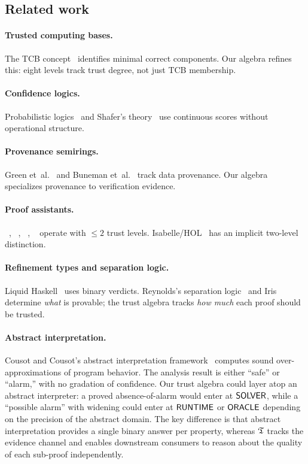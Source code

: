 \documentclass[11pt]{article}
\begin{document}
\subsection{Related work}

\paragraph{Trusted computing bases.}
The TCB concept~\cite{sel4,certikos} identifies minimal correct
components.  Our algebra refines this: eight levels track trust
degree, not just TCB membership.

\paragraph{Confidence logics.}
Probabilistic logics~\cite{halpern03} and Shafer's
theory~\cite{shafer76} use continuous scores without
operational structure.

\paragraph{Provenance semirings.}
Green et~al.~\cite{green07} and Buneman et~al.~\cite{buneman01}
track data provenance.  Our algebra specializes provenance
to verification evidence.

\paragraph{Proof assistants.}
\LEAN{}~\cite{lean4}, \Coq{}~\cite{coq}, \Fstar{}~\cite{fstar},
\Dafny{}~\cite{dafny} operate with $\leq 2$ trust levels.
Isabelle/HOL~\cite{isabelle} has an implicit two-level distinction.

\paragraph{Refinement types and separation logic.}
Liquid Haskell~\cite{liquidhaskell} uses binary verdicts.
Reynolds's separation logic~\cite{reynolds02} and Iris~\cite{iris}
determine \emph{what} is provable; the trust algebra tracks
\emph{how much} each proof should be trusted.

\paragraph{Abstract interpretation.}
Cousot and Cousot's abstract interpretation
framework~\cite{cousot77} computes sound over-approximations
of program behavior.  The analysis result is either ``safe''
or ``alarm,'' with no gradation of confidence.  Our trust
algebra could layer atop an abstract interpreter: a proved
absence-of-alarm would enter at $\mathsf{SOLVER}$, while a
``possible alarm'' with widening could enter at $\mathsf{RUNTIME}$
or $\mathsf{ORACLE}$ depending on the precision of the abstract
domain.  The key difference is that abstract interpretation
provides a single binary answer per property, whereas $\mathfrak{T}$
tracks the evidence channel and enables downstream consumers
to reason about the quality of each sub-proof independently.
\end{document}

